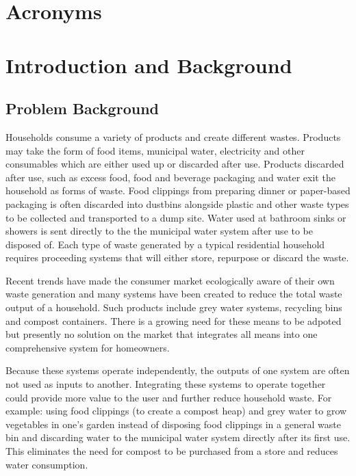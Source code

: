\documentclass[a4paper,11pt,fleqn]{report}
\begin{document}
\tableofcontents
\listoffigures{}
\listoftables{}

\chapter*{Acronyms}
\begin{acronym}[ABCDEF]
\end{acronym}

\chapter{Introduction and Background}
\setcounter{page}{1}
\acresetall

\section{Problem Background} \label{sec: Problem Background}
Households consume a variety of products and create different wastes. Products may take the form of food items, municipal water, electricity and other consumables which are either used up or discarded after use. Products discarded after use, such as excess food, food and beverage packaging and water exit the household as forms of waste.  Food clippings from preparing dinner or paper-based packaging is often discarded into dustbins alongside plastic and other waste types to be collected and transported to a dump site. Water used at bathroom sinks or showers is sent directly to the the municipal water system after use to be disposed of. Each type of waste generated by a typical residential household requires proceeding systems that will either store, repurpose or discard the waste.
  
Recent trends have made the consumer market ecologically aware of their own waste generation and many systems have been created to reduce the total waste output of a household. Such products include grey water systems, recycling bins and compost containers. There is a growing need for these means to be adpoted but presently no solution on the market that integrates all means into one comprehensive system for homeowners.
  
Because these systems operate independently, the outputs of one system are often not used as inputs to another. Integrating these systems to operate together could provide more value to the user and further reduce household waste. For example: using food clippings (to create a compost heap) and grey water to grow vegetables in one's garden instead of disposing food clippings in a general waste bin and discarding water to the municipal water system directly after its first use. This eliminates the need for compost to be purchased from a store and reduces water consumption.
\end{document}
